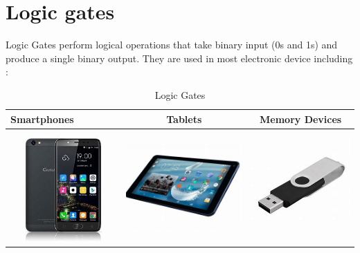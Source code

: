 \documentclass{article}
\begin{document}
	\section{Logic gates}
	Logic Gates perform logical operations that take binary input (0s and 1s) and produce a single binary output. They are used in most electronic device including :
	
	\begin{table}[h!]
		\begin{center}
		\caption{Logic Gates}
		\label{tab:table1}
		\begin{tabular}{|l|c|c|}
			\hline
			Smartphones
			&
			Tablets
			&
			Memory Devices
			\\
			\hline
			\includegraphics[width=0.2\linewidth]{smartphone}
			&
			\includegraphics[width=0.25\linewidth]{tablet}
			&
				\includegraphics[width=0.25\linewidth]{flashdrive}\\
				\hline
				
		\end{tabular}
		\end{center}
	\end{table}
	
\end{document}
